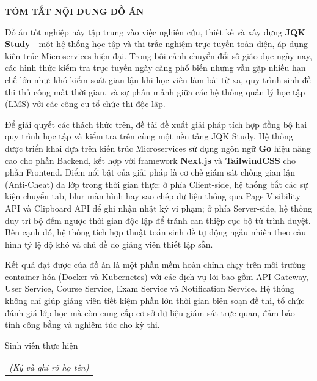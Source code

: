 \documentclass[../DoAn.tex]{subfiles}
\begin{document}
\begin{center}
    \Large{\textbf{TÓM TẮT NỘI DUNG ĐỒ ÁN}}\\
\end{center}
\vspace{1cm}

Đồ án tốt nghiệp này tập trung vào việc nghiên cứu, thiết kế và xây dựng \textbf{JQK Study} - một hệ thống học tập và thi trắc nghiệm trực tuyến toàn diện, áp dụng kiến trúc Microservices hiện đại. Trong bối cảnh chuyển đổi số giáo dục ngày nay, các hình thức kiểm tra trực tuyến ngày càng phổ biến nhưng vẫn gặp nhiều hạn chế lớn như: khó kiểm soát gian lận khi học viên làm bài từ xa, quy trình sinh đề thi thủ công mất thời gian, và sự phân mảnh giữa các hệ thống quản lý học tập (LMS) với các công cụ tổ chức thi độc lập. 

Để giải quyết các thách thức trên, đề tài đề xuất giải pháp tích hợp đồng bộ hai quy trình học tập và kiểm tra trên cùng một nền tảng JQK Study. Hệ thống được triển khai dựa trên kiến trúc Microservices sử dụng ngôn ngữ \textbf{Go} hiệu năng cao cho phần Backend, kết hợp với framework \textbf{Next.js} và \textbf{TailwindCSS} cho phần Frontend. Điểm nổi bật của giải pháp là cơ chế giám sát chống gian lận (Anti-Cheat) đa lớp trong thời gian thực: ở phía Client-side, hệ thống bắt các sự kiện chuyển tab, blur màn hình hay sao chép dữ liệu thông qua Page Visibility API và Clipboard API để ghi nhận nhật ký vi phạm; ở phía Server-side, hệ thống duy trì bộ đếm ngược thời gian độc lập để tránh can thiệp cục bộ từ trình duyệt. Bên cạnh đó, hệ thống tích hợp thuật toán sinh đề tự động ngẫu nhiên theo cấu hình tỷ lệ độ khó và chủ đề do giảng viên thiết lập sẵn.

Kết quả đạt được của đồ án là một phần mềm hoàn chỉnh chạy trên môi trường container hóa (Docker và Kubernetes) với các dịch vụ lõi bao gồm API Gateway, User Service, Course Service, Exam Service và Notification Service. Hệ thống không chỉ giúp giảng viên tiết kiệm phần lớn thời gian biên soạn đề thi, tổ chức đánh giá lớp học mà còn cung cấp cơ sở dữ liệu giám sát trực quan, đảm bảo tính công bằng và nghiêm túc cho kỳ thi.

\begin{flushright}
Sinh viên thực hiện\\
\begin{tabular}{@{}c@{}}
\textit{(Ký và ghi rõ họ tên)}
\end{tabular}
\end{flushright}
\end{document}
